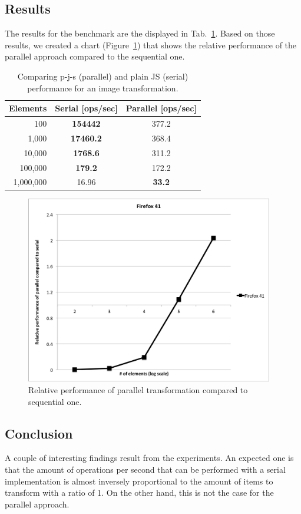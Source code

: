 \documentclass[runningheads,a4paper]{llncs}
\begin{document}
\subsection{Results}
The results for the benchmark are the displayed in Tab.~\ref{tab:benchmark}. Based on those results, we created a chart (Figure~\ref{fig:relative}) that shows the relative performance of the parallel approach compared to the sequential one.
\begin{table}
  \centering
  \begin{tabular}{|r|c|c|}
    \hline
    Elements & Serial [ops/sec] & Parallel [ops/sec] \\
    \hline
    100 & \textbf{154442} & 377.2\\
    1,000 & \textbf{17460.2} &  368.4 \\
    10,000 & \textbf{1768.6} & 311.2 \\
    100,000 & \textbf{179.2} & 172.2 \\
    1,000,000 & 16.96 & \textbf{33.2} \\
    \hline
  \end{tabular}
  \caption{Comparing p-j-s (parallel) and plain JS (serial) performance for an image transformation.}
  \label{tab:benchmark}
\end{table}

\begin{figure}
\centering
\includegraphics[height=8.2cm]{comparison}
\caption{Relative performance of parallel transformation compared to sequential one.}
\label{fig:relative}
\end{figure}

\subsection{Conclusion}
A couple of interesting findings result from the experiments. An expected one is that the amount of operations per second that can be performed with a serial implementation is almost inversely proportional to the amount of items to transform with a ratio of 1. On the other hand, this is not the case for the parallel approach.
\end{document}
